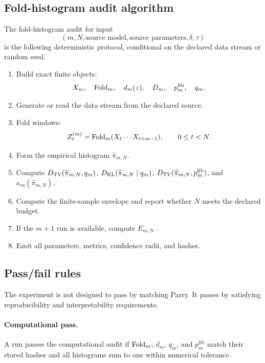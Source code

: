 \subsection{Fold-histogram audit algorithm}

\begin{definition}
\label{def:fold-histogram-audit}
The fold-histogram audit for input
\[
(m,N,\text{source model},\text{source parameters},\delta,\tau)
\]
is the following deterministic protocol, conditional on the declared data stream or random seed.
\begin{enumerate}[label=(C\arabic*)]
\item Build exact finite objects:
\[
X_m,\quad \operatorname{Fold}_m,\quad d_m(z),\quad D_m,\quad p_m^{\mathrm{fib}},\quad q_m.
\]
\item Generate or read the data stream from the declared source.
\item Fold windows:
\[
Z_t^{(m)}=\operatorname{Fold}_m(X_t\cdots X_{t+m-1}),
\qquad 0\le t<N.
\]
\item Form the empirical histogram \(\widehat\pi_{m,N}\).
\item Compute \(D_{\mathrm{TV}}(\widehat\pi_{m,N},q_m)\), \(D_{\mathrm{KL}}(\widehat\pi_{m,N}\mid q_m)\), \(D_{\mathrm{TV}}(\widehat\pi_{m,N},p_m^{\mathrm{fib}})\), and \(\kappa_m(\widehat\pi_{m,N})\).
\item Compute the finite-sample envelope and report whether \(N\) meets the declared budget.
\item If the \(m+1\) run is available, compute \(E_{m,N}\).
\item Emit all parameters, metrics, confidence radii, and hashes.
\end{enumerate}
\end{definition}

\subsection{Pass/fail rules}

The experiment is not designed to pass by matching Parry.  It passes by satisfying reproducibility and interpretability requirements.

\paragraph{Computational pass.}
A run passes the computational audit if \(\operatorname{Fold}_m\), \(d_m\), \(q_m\), and \(p_m^{\mathrm{fib}}\) match their stored hashes and all histograms sum to one within numerical tolerance.

